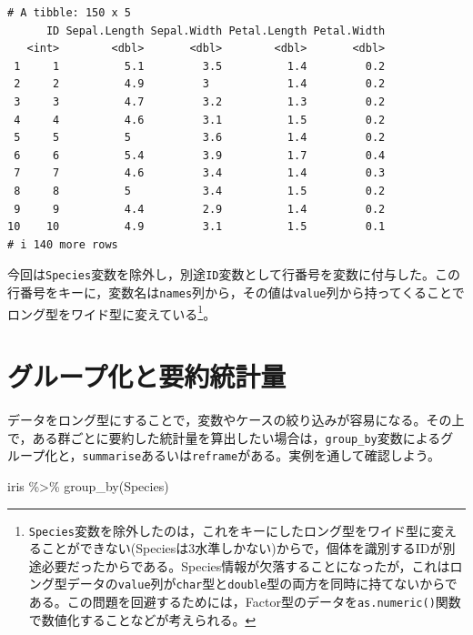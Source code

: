 \documentclass[
  a4paper,
]{ltjsbook}
\newenvironment{Shaded}{\begin{snugshade}}{\end{snugshade}}
\newcommand{\FunctionTok}[1]{\textcolor[rgb]{0.28,0.35,0.67}{#1}}
\newcommand{\NormalTok}[1]{\textcolor[rgb]{0.00,0.23,0.31}{#1}}
\newcommand{\SpecialCharTok}[1]{\textcolor[rgb]{0.37,0.37,0.37}{#1}}
\begin{document}
\begin{verbatim}
# A tibble: 150 x 5
      ID Sepal.Length Sepal.Width Petal.Length Petal.Width
   <int>        <dbl>       <dbl>        <dbl>       <dbl>
 1     1          5.1         3.5          1.4         0.2
 2     2          4.9         3            1.4         0.2
 3     3          4.7         3.2          1.3         0.2
 4     4          4.6         3.1          1.5         0.2
 5     5          5           3.6          1.4         0.2
 6     6          5.4         3.9          1.7         0.4
 7     7          4.6         3.4          1.4         0.3
 8     8          5           3.4          1.5         0.2
 9     9          4.4         2.9          1.4         0.2
10    10          4.9         3.1          1.5         0.1
# i 140 more rows
\end{verbatim}

今回は\texttt{Species}変数を除外し，別途\texttt{ID}変数として行番号を変数に付与した。この行番号をキーに，変数名は\texttt{names}列から，その値は\texttt{value}列から持ってくることでロング型をワイド型に変えている\footnote{\texttt{Species}変数を除外したのは，これをキーにしたロング型をワイド型に変えることができない(Speciesは3水準しかない)からで，個体を識別するIDが別途必要だったからである。Species情報が欠落することになったが，これはロング型データの\texttt{value}列が\texttt{char}型と\texttt{double}型の両方を同時に持てないからである。この問題を回避するためには，Factor型のデータを\texttt{as.numeric()}関数で数値化することなどが考えられる。}。

\section{グループ化と要約統計量}\label{ux30b0ux30ebux30fcux30d7ux5316ux3068ux8981ux7d04ux7d71ux8a08ux91cf}

データをロング型にすることで，変数やケースの絞り込みが容易になる。その上で，ある群ごとに要約した統計量を算出したい場合は，\texttt{group\_by}変数によるグループ化と，\texttt{summarise}あるいは\texttt{reframe}がある。実例を通して確認しよう。

\begin{Shaded}
\begin{Highlighting}[]
\NormalTok{iris }\SpecialCharTok{\%\textgreater{}\%} \FunctionTok{group\_by}\NormalTok{(Species)}
\end{Highlighting}
\end{Shaded}
\end{document}

